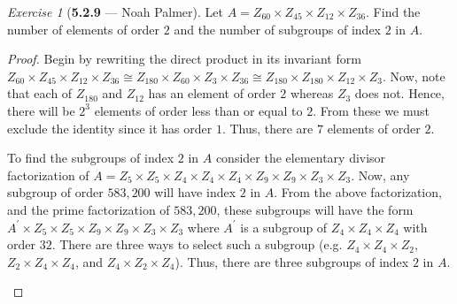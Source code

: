 \documentclass[12pt]{amsart}
\theoremstyle{remark}
\newtheorem*{exercise}{Exercise}%
\theoremstyle{mycomment}
\begin{document}
  \begin{exercise}[\textbf{5.2.9} --- Noah Palmer] Let $A=Z_{60}\times Z_{45}\times Z_{12}\times Z_{36}$. Find the number of elements of order $2$ and the number of subgroups of index $2$ in $A$.
    \begin{proof}
    Begin by rewriting the direct product in its invariant form $Z_{60}\times Z_{45}\times Z_{12}\times Z_{36}\cong Z_{180}\times Z_{60}\times Z_3\times Z_{36}\cong Z_{180}\times Z_{180}\times Z_{12}\times Z_{3}$. Now, note that each of $Z_{180}$ and $Z_{12}$ has an element of order $2$ whereas $Z_{3}$ does not. Hence, there will be $2^3$ elements of order less than or equal to $2$. From these we must exclude the identity since it has order $1$. Thus, there are $7$ elements of order $2$.
    
    To find the subgroups of index $2$ in $A$ consider the elementary divisor factorization of $A=Z_{5}\times Z_{5}\times Z_{4}\times Z_{4}\times Z_4\times Z_{9}\times Z_{9}\times Z_3\times Z_3$. Now, any subgroup of order $583,200$ will have index $2$ in $A$. From the above factorization, and the prime factorization of $583,200$, these subgroups will have the form $A^\prime\times Z_{5}\times Z_{5}\times Z_{9}\times Z_{9}\times Z_3\times Z_3$ where $A^\prime$ is a subgroup of $Z_{4}\times Z_{4}\times Z_4$ with order $32$. There are three ways to select such a subgroup (e.g. $Z_4\times Z_4\times Z_2$, $Z_2\times Z_4\times Z_4$, and $Z_4\times Z_2\times Z_4$). Thus, there are three subgroups of index $2$ in $A$.
    \begin{center}
    
    \end{center}
    \end{proof}
    \end{exercise}
\vspace{.15in}

  
\end{document}
